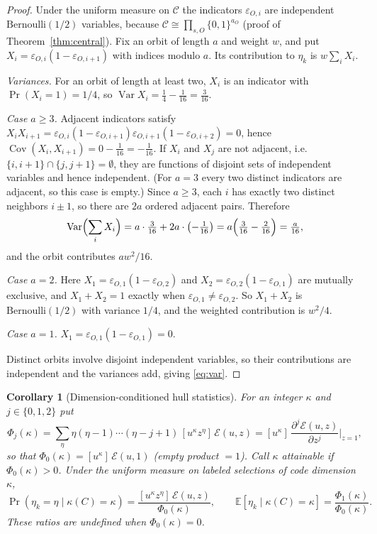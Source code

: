 \documentclass[10pt,a4paper]{article}
\newcommand{\Epoly}{\mathscr E}
\numberwithin{equation}{section}
\theoremstyle{plain}
\newtheorem{corollary}[theorem]{Corollary}
\theoremstyle{definition}
\theoremstyle{remark}
\begin{document}
\begin{proof}
Under the uniform measure on $\mathscr C$ the indicators
$\varepsilon_{O,i}$ are independent $\mathrm{Bernoulli}(1/2)$ variables, because
$\mathscr C\cong\prod_{s,O}\{0,1\}^{a_O}$ (proof of
Theorem~\ref{thm:central}). Fix an orbit of length $a$ and weight $w$, and put
$X_i=\varepsilon_{O,i}(1-\varepsilon_{O,i+1})$ with indices modulo $a$. Its
contribution to $\eta_k$ is $w\sum_{i}X_i$.

\emph{Variances.} For an orbit of length at least two, $X_i$ is an indicator with
$\Pr(X_i=1)=1/4$, so $\operatorname{Var}X_i=\tfrac14-\tfrac1{16}=\tfrac3{16}$.

\emph{Case $a\ge3$.} Adjacent indicators satisfy
$X_iX_{i+1}=\varepsilon_{O,i}(1-\varepsilon_{O,i+1})\varepsilon_{O,i+1}(1-\varepsilon_{O,i+2})=0$,
hence $\operatorname{Cov}(X_i,X_{i+1})=0-\tfrac1{16}=-\tfrac1{16}$. If $X_i$ and
$X_j$ are not adjacent, i.e.\ $\{i,i+1\}\cap\{j,j+1\}=\emptyset$, they are
functions of disjoint sets of independent variables and hence independent. (For
$a=3$ every two distinct indicators are adjacent, so this case is empty.) Since
$a\ge3$, each $i$ has exactly two distinct neighbors $i\pm1$, so there are $2a$
ordered adjacent pairs. Therefore
\[
\operatorname{Var}\Bigl(\sum_i X_i\Bigr)
 = a\cdot\tfrac3{16}+2a\cdot\bigl(-\tfrac1{16}\bigr)
 = a\Bigl(\tfrac3{16}-\tfrac2{16}\Bigr)=\tfrac{a}{16},
\]
and the orbit contributes $a w^{2}/16$.

\emph{Case $a=2$.} Here $X_1=\varepsilon_{O,1}(1-\varepsilon_{O,2})$ and
$X_2=\varepsilon_{O,2}(1-\varepsilon_{O,1})$ are mutually exclusive, and
$X_1+X_2=1$ exactly when $\varepsilon_{O,1}\ne\varepsilon_{O,2}$. So $X_1+X_2$ is
$\mathrm{Bernoulli}(1/2)$ with variance $1/4$, and the weighted contribution is
$w^{2}/4$.

\emph{Case $a=1$.} $X_1=\varepsilon_{O,1}(1-\varepsilon_{O,1})=0$.

Distinct orbits involve disjoint independent variables, so their contributions are
independent and the variances add, giving \eqref{eq:var}.
\end{proof}

\begin{corollary}[Dimension-conditioned hull statistics]\label{cor:conditional}
For an integer $\kappa$ and $j\in\{0,1,2\}$ put
\[
\Phi_j(\kappa)=\sum_{\eta}\eta(\eta-1)\cdots(\eta-j+1)\,
 [u^{\kappa}z^{\eta}]\,\Epoly(u,z)
 =[u^{\kappa}]\,\frac{\partial^{j}\Epoly(u,z)}{\partial z^{j}}\Big|_{z=1},
\]
so that $\Phi_0(\kappa)=[u^{\kappa}]\,\Epoly(u,1)$ (empty product $=1$). Call
$\kappa$ attainable if $\Phi_0(\kappa)>0$. Under the uniform measure on labeled
selections of code dimension $\kappa$,
\begin{equation}\label{eq:conditional}
\Pr(\eta_k=\eta\mid\kappa(C)=\kappa)
 =\frac{[u^{\kappa}z^{\eta}]\,\Epoly(u,z)}{\Phi_0(\kappa)},\qquad
\mathbb E[\eta_k\mid\kappa(C)=\kappa]=\frac{\Phi_1(\kappa)}{\Phi_0(\kappa)}.
\end{equation}
These ratios are undefined when $\Phi_0(\kappa)=0$.
\end{corollary}
\end{document}
